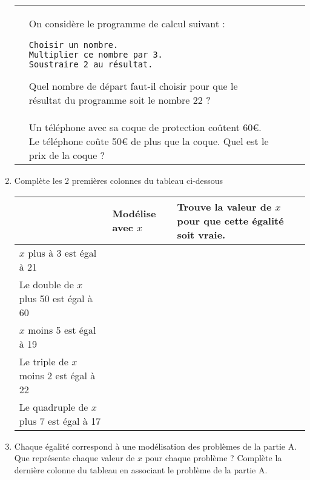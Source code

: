 \begin{enumerate}
\begin{tabular}{|>{\centering\arraybackslash}p{0.5cm}|>{\centering\arraybackslash}p{10.5cm}|>{\centering\arraybackslash}p{6cm}|>{\centering\arraybackslash}p{2cm}|>{\centering\arraybackslash}p{3cm}|}
&  &  &   \\ 
\hline 
4&On considère le programme de calcul suivant :
\begin{verbatim}
Choisir un nombre.
Multiplier ce nombre par 3.
Soustraire 2 au résultat.
\end{verbatim}
Quel nombre de départ faut-il choisir pour que le résultat du
programme soit le nombre 22 ? &  &  &   \\ 
\hline 
5&Un téléphone avec sa coque de protection coûtent 60€.
Le téléphone coûte 50€ de plus que la coque.
Quel est le prix de la coque ? &  &  &   \\ 
\hline 
\end{tabular} 



\item Complète les 2 premières colonnes du tableau ci-dessous

\begin{tabular}{|>{\centering\arraybackslash}p{5.5cm}|>{\centering\arraybackslash}p{6cm}|>{\centering\arraybackslash}p{8cm}|>{\centering\arraybackslash}p{2cm}|}
\hline 
 & Modélise avec $x$ & Trouve la valeur de $x$ pour que cette égalité soit vraie. &  \\ 
\hline 
$x$ plus à 3 est égal à 21 &  &  &  \\ 
\hline 
Le double de $x$ plus 50 est égal à 60 &  &  &  \\ 
\hline 
$x$ moins 5 est égal à 19 &  &  &   \\ 
\hline 
Le triple de $x$ moins 2 est égal à 22 &  &  &   \\ 
\hline 
Le quadruple de $x$ plus 7 est égal à 17&  &  &   \\ 
\hline 
\end{tabular} 

\item Chaque égalité correspond à une modélisation des problèmes de la partie A. Que représente chaque valeur de $x$ pour chaque problème ? Complète la dernière colonne du tableau en associant le problème de la partie A.
\end{enumerate}

